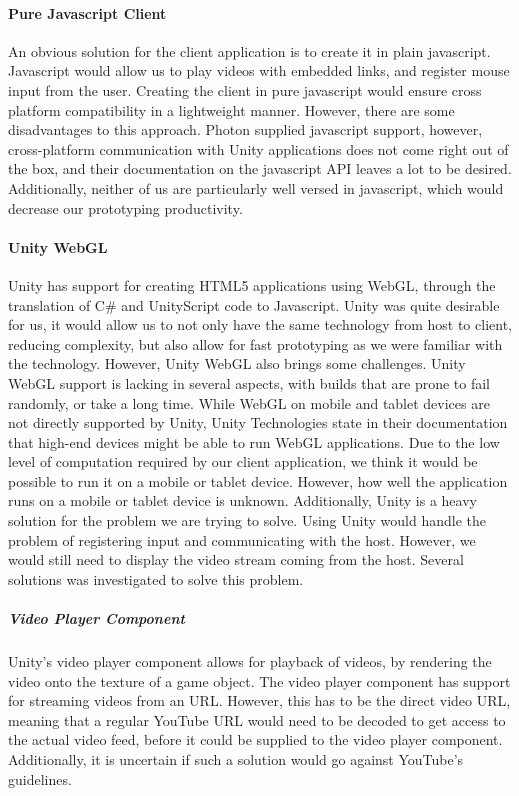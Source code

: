 \paragraph{Pure Javascript Client}
An obvious solution for the client application is to create it in plain javascript. Javascript would allow us to play videos with embedded links, and register mouse input from the user. Creating the client in pure javascript would ensure cross platform compatibility in a lightweight manner. However, there are some disadvantages to this approach. Photon supplied javascript support, however, cross-platform communication with Unity applications does not come right out of the box\cite{photon_javascript}, and their documentation on the javascript API leaves a lot to be desired. Additionally, neither of us are particularly well versed in javascript, which would decrease our prototyping productivity. 

\paragraph{Unity WebGL}
Unity has support for creating HTML5 applications using WebGL\cite{unity_webgl}, through the translation of C\# and UnityScript code to Javascript. Unity was quite desirable for us, it would allow us to not only have the same technology from host to client, reducing complexity, but also allow for fast prototyping as we were familiar with the technology. 
However, Unity WebGL also brings some challenges. Unity WebGL support is lacking in several aspects, with builds that are prone to fail randomly, or take a long time. While WebGL on mobile and tablet devices are not directly supported by Unity, Unity Technologies state in their documentation that high-end devices might be able to run WebGL applications. Due to the low level of computation required by our client application, we think it would be possible to run it on a mobile or tablet device. However, how well the application runs on a mobile or tablet device is unknown. Additionally, Unity is a heavy solution for the problem we are trying to solve.
Using Unity would handle the problem of registering input and communicating with the host. However, we would still need to display the video stream coming from the host. Several solutions was investigated to solve this problem.

\subparagraph{Video Player Component}
Unity's video player component allows for playback of videos, by rendering the video onto the texture of a game object\cite{unity_video_player}. The video player component has support for streaming videos from an URL. However, this has to be the direct video URL, meaning that a regular YouTube URL would need to be decoded to get access to the actual video feed, before it could be supplied to the video player component. Additionally, it is uncertain if such a solution would go against YouTube's guidelines\cite[5.1 A]{youtube_guidelines}.

